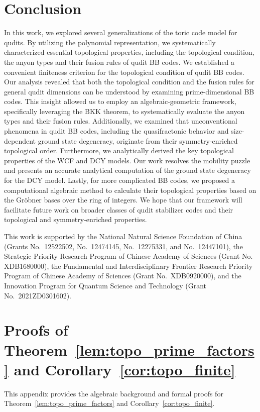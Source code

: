 \documentclass[aps,prb,english,superscriptaddress,twocolumn,tightenlines,showpacs,longbibliography,floatfix,amsfonts]{revtex4-2}
\begin{document}
\section{Conclusion\label{sec8}}
In this work, we explored several generalizations of the toric code model for qudits. By utilizing the polynomial representation, we systematically characterized essential topological properties, including the topological condition, the anyon types and their fusion rules of qudit BB codes. We established a convenient finiteness criterion for the topological condition of qudit BB codes. Our analysis revealed that both the topological condition and the fusion rules for general qudit dimensions can be understood by examining prime-dimensional BB codes. This insight allowed us to employ an algebraic-geometric framework, specifically leveraging the BKK theorem, to systematically evaluate the anyon types and their fusion rules. Additionally, we examined that unconventional phenomena in qudit BB codes, including the quasifractonic behavior and size-dependent ground state degeneracy, originate from their symmetry-enriched topological order. Furthermore, we analytically derived the key topological properties of the WCF and DCY models. Our work resolves the mobility puzzle and presents an accurate analytical computation of the ground state degeneracy for the DCY model. Lastly, for more complicated BB codes, we proposed a computational algebraic method to calculate their topological properties based on the Gr\"{o}bner bases over the ring of integers. We hope that our framework will facilitate future work on broader classes of qudit stabilizer codes and their topological and symmetry-enriched properties.

\begin{acknowledgments}
This work is supported by the National Natural Science Foundation of China (Grants No.~12522502, No.~12474145, No.~12275331, and No.~12447101), the Strategic Priority Research Program of Chinese Academy of Sciences (Grant No. XDB1680000), the Fundamental and Interdisciplinary Frontier Research Priority Program of Chinese Academy of Sciences (Grant No.~XDB0920000), and the Innovation Program for Quantum Science and Technology (Grant No.~2021ZD0301602).
\end{acknowledgments}

\appendix

\section{Proofs of Theorem~\ref{lem:topo_prime_factors} and Corollary~\ref{cor:topo_finite}}
\label{app1}
This appendix provides the algebraic background and formal proofs for Theorem~\ref{lem:topo_prime_factors} and Corollary~\ref{cor:topo_finite}.
\end{document}
